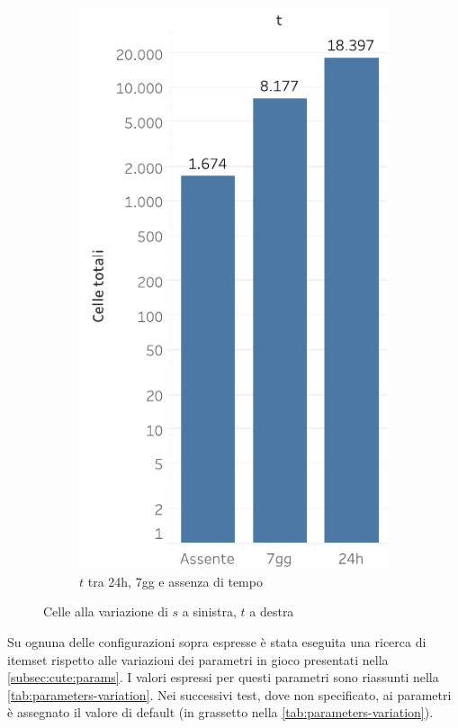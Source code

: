 \begin{figure}
\begin{subfigure}{.5\textwidth}
   \includegraphics[scale=0.5]{res/fig/sec-4/CellT.pdf}
   \caption{\(t\) tra 24h, 7gg e assenza di tempo}
  \label{fig:chap-4:cellt}
\end{subfigure}%
  \caption{Celle alla variazione di \(s\) a sinistra, \(t\) a destra}%
  \label{fig:chap-4:cellst}
\end{figure}

Su ognuna delle configurazioni sopra espresse è stata eseguita una ricerca di itemset rispetto alle variazioni dei parametri in gioco presentati nella \cref{subsec:cute:params}.
I valori espressi per questi parametri sono riassunti nella \cref{tab:parameters-variation}.
Nei successivi test, dove non specificato, ai parametri è assegnato il valore di default (in grassetto nella \cref{tab:parameters-variation}).

